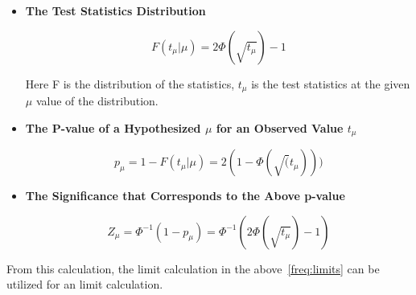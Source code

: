 \begin{itemize}
    \item \textbf{The Test Statistics Distribution}

\begin{equation}
    F(t_{\mu}| \mu) = 2\Phi(\sqrt{t_{\mu}})-1
\label{eq:teststatistics}
\end{equation}

Here F is the distribution of the statistics, $t_\mu$ is the test statistics at the given $\mu$ value of the distribution. 

\item \textbf{The P-value of a Hypothesized $\mu$ for an Observed Value $t_\mu$}

\begin{equation}
p_{\mu} = 1-F(t_{\mu}| \mu)=2(1-\Phi(\sqrt(t_{\mu})))
\end{equation}


\item \textbf{The Significance that Corresponds to the Above p-value}

\begin{equation}
Z_{\mu} = \Phi^{-1}(1-p_{\mu})  = \Phi^{-1}(2\Phi(\sqrt{t_{\mu}})-1)
\end{equation}

\end{itemize}

From this calculation, the limit calculation in the above~\ref{freq:limits} can be utilized for an limit calculation. 

%
%
%



%
%


